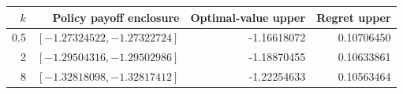 \begin{tabular}{r r r r}
\toprule
$k$ & Policy payoff enclosure & Optimal-value upper & Regret upper \\
\midrule
0.5 & $[-1.27324522,-1.27322724]$ & -1.16618072 & 0.10706450 \\
2 & $[-1.29504316,-1.29502986]$ & -1.18870455 & 0.10633861 \\
8 & $[-1.32818098,-1.32817412]$ & -1.22254633 & 0.10563464 \\
\bottomrule
\end{tabular}
